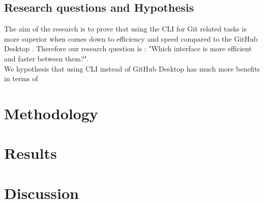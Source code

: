 \documentclass[]{report}
\begin{document}
	\subsection{Research questions and Hypothesis}
	The aim of the research is to prove that using the CLI for Git related tasks is more superior when comes down to efficiency and speed compared to the GitHub Desktop . Therefore our research question is : "Which interface is more efficient and faster between them?".\\
	
	We hypothesis that using CLI instead of GitHub Desktop has much more benefits in terms of 
	\section{Methodology}
	\lipsum
	\section{Results}
	\newpage	
	\section{Discussion}
\end{document}
